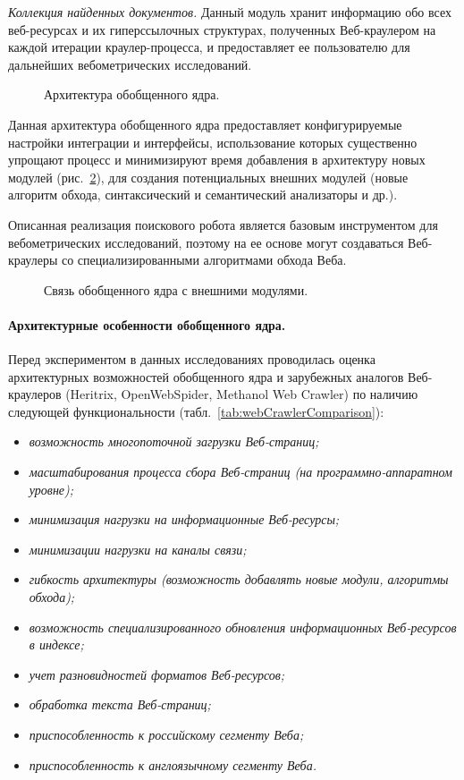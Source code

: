 \textit{Коллекция найденных документов.} Данный модуль хранит информацию обо всех веб-ресурсах и их гиперссылочных структурах, полученных Веб-краулером на каждой итерации краулер-процесса, и предоставляет ее пользователю для дальнейших вебометрических исследований.

\begin{figure}[ht]
	\caption{Архитектура обобщенного ядра.}\label{fig:kernelArchitecture}
\end{figure}

Данная архитектура обобщенного ядра предоставляет конфигурируемые настройки интеграции и интерфейсы, использование которых существенно упрощают процесс и минимизируют время добавления в архитектуру новых модулей (рис.~\cref{fig:kernelModuleLink}), для создания потенциальных внешних модулей (новые алгоритм обхода, синтаксический и семантический анализаторы и др.).

Описанная реализация поискового робота является базовым инструментом для вебометрических исследований, поэтому на ее основе могут создаваться Веб-краулеры со специализированными алгоритмами обхода Веба.

\begin{figure}[ht]
	\caption{Связь обобщенного ядра с внешними модулями.}\label{fig:kernelModuleLink}
\end{figure}

\paragraph{Архитектурные особенности обобщенного ядра.} Перед экспериментом в данных исследованиях проводилась оценка архитектурных возможностей обобщенного ядра и зарубежных аналогов Веб-краулеров (Heritrix, OpenWebSpider, Methanol Web Crawler) по наличию следующей функциональности (табл.~\cref{tab:webCrawlerComparison}):
\begin{itemize}
	\item \textit{возможность многопоточной загрузки Веб-страниц;}
	\item \textit{масштабирования процесса сбора Веб-страниц (на программно-аппаратном уровне);}
	\item \textit{минимизация нагрузки на информационные Веб-ресурсы;}
	\item \textit{минимизации нагрузки на каналы связи;}
	\item \textit{гибкость архитектуры (возможность добавлять новые модули, алгоритмы обхода);}
	\item \textit{возможность специализированного обновления информационных Веб-ресурсов в индексе;}
	\item \textit{учет разновидностей форматов Веб-ресурсов;}
	\item \textit{обработка текста Веб-страниц;}
	\item \textit{приспособленность к российскому сегменту Веба;}
	\item \textit{приспособленность к англоязычному сегменту Веба.}
\end{itemize}

